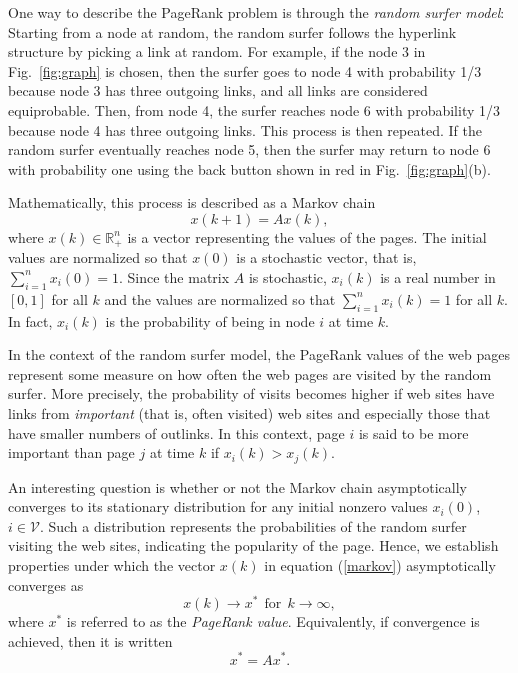 \documentclass[11pt,draftcls,onecolumn]{IEEEtran}
\newcommand{\field}[1]{{\mathbb{#1}}}
\newcommand{\R}{\field{R}}
\begin{document}
\vspace{.5cm}

One way to describe the PageRank problem is through 
the {\it random surfer model}: Starting from a node at random, 
the random surfer follows the hyperlink structure by picking a link at random. For example, 
if the node 3 in Fig.~\ref{fig:graph} is chosen, then the surfer goes to node 4 with probability 1/3 because 
node 3 has three outgoing links, and all links are considered equiprobable. Then,
from node 4, the surfer reaches node 6 with probability 1/3 because node 4 has three outgoing links. 
This process is then repeated. If the random surfer eventually reaches node 5, then the surfer may 
return to node 6  with probability one using the back button shown in red in 
Fig.~\ref{fig:graph}\;(b).

Mathematically, this process is described as a Markov chain 
\begin{equation}
x(k+1) = A x(k),
\label{markov}
\end{equation}
where $x(k) \in \R_+^{n}$ is a vector representing the values of the pages. 
The initial values are normalized so that $x(0)$ is 
a stochastic vector, that is,
$\sum_{i=1}^n x_i(0) = 1$. 
Since the matrix $A$ is stochastic, $x_i(k)$ is a real number 
in $[0,1]$ for all $k$ and the values are normalized so that 
$\sum_{i=1}^n x_i(k) = 1$ for all $k$. 
In fact, $x_i(k)$ is the probability of being in
node $i$ at time $k$.

In the context of the random surfer model, the PageRank values of the web pages
represent some measure on how often the web pages are visited by the random surfer. 
More precisely, the probability of visits becomes higher if web sites have links 
from {\it important} (that is, often visited) web sites and especially those
that have smaller numbers of outlinks.
In this context, 
page $i$ is said to be more important than page $j$ at time $k$ if $x_i(k) > x_j(k)$.

An interesting question is whether or not the Markov chain asymptotically converges to its 
stationary distribution for any initial nonzero values $x_i(0)$, $i\in\mathcal{V}$.
Such a distribution represents the probabilities of the random surfer visiting the
web sites, indicating the popularity of the page. 
Hence, we establish properties under which 
the vector $x(k)$ in equation (\ref{markov}) asymptotically converges as
$$
x(k) \rightarrow x^* \ \ \mbox{for} \ \ k \rightarrow \infty,
$$
where $x^*$ is referred to as the {\it PageRank value}. 
Equivalently, if convergence is achieved, then it is written 
$$
x^* = A x^*.
$$
\end{document}
